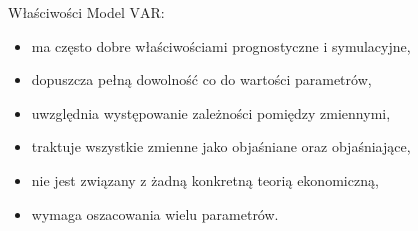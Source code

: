 \documentclass[a4paper, 11pt]{beamer}
\begin{document}
	\begin{frame}{Właściwości}
		Model $\mbox{VAR}:$
		\begin{itemize}
			\item ma często dobre właściwościami prognostyczne i 
				symulacyjne,
			\item dopuszcza pełną dowolność co do wartości parametrów,
			\item uwzględnia występowanie zależności pomiędzy zmiennymi,
			\item traktuje wszystkie zmienne jako objaśniane oraz 
				objaśniające,
			\item nie jest związany z żadną konkretną teorią 
				ekonomiczną,
			\item wymaga oszacowania wielu parametrów.
		\end{itemize}
	\end{frame}
	
\end{document}
